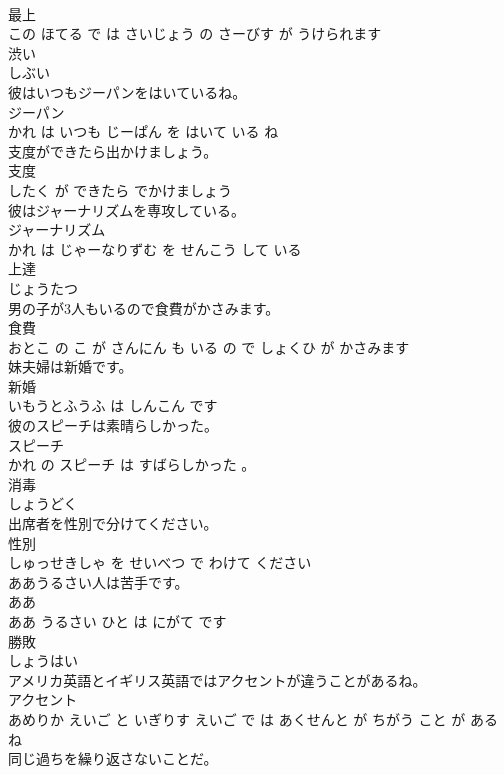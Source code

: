\documentclass[8pt]{extreport}
\begin{document}
\begin{CJK}{UTF8}{min}
\\	最上 
\\	この ほてる で は さいじょう の さーびす が うけられます			
\\	渋い	
\\	しぶい			
\\	彼はいつもジーパンをはいているね。	
\\	ジーパン 
\\	かれ は いつも じーぱん を はいて いる ね			
\\	支度ができたら出かけましょう。	
\\	支度 
\\	したく が できたら でかけましょう			
\\	彼はジャーナリズムを専攻している。	
\\	ジャーナリズム 
\\	かれ は じゃーなりずむ を せんこう して いる			
\\	上達	
\\	じょうたつ			
\\	男の子が3人もいるので食費がかさみます。	
\\	食費 
\\	おとこ の こ が さんにん も いる の で しょくひ が かさみます			
\\	妹夫婦は新婚です。	
\\	新婚 
\\	いもうとふうふ は しんこん です			
\\	彼のスピーチは素晴らしかった。	
\\	スピーチ 
\\	かれ の スピーチ は すばらしかった 。			
\\	消毒	
\\	しょうどく			
\\	出席者を性別で分けてください。	
\\	性別 
\\	しゅっせきしゃ を せいべつ で わけて ください			
\\	ああうるさい人は苦手です。	
\\	ああ 
\\	ああ うるさい ひと は にがて です			
\\	勝敗	
\\	しょうはい			
\\	アメリカ英語とイギリス英語ではアクセントが違うことがあるね。	
\\	アクセント 
\\	あめりか えいご と いぎりす えいご で は あくせんと が ちがう こと が ある ね			
\\	同じ過ちを繰り返さないことだ。	

\end{CJK}
\end{document}
